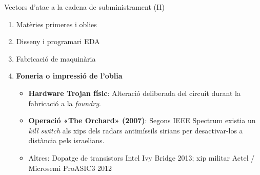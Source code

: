 \documentclass[catalan]{beamer}
\begin{document}

\begin{frame}{Vectors d'atac a la cadena de subministrament (II)}
  \begin{enumerate}
    \item \textcolor{black!35}{Matèries primeres i oblies}
    \item \textcolor{black!35}{Disseny i programari EDA}
    \item \textcolor{black!35}{Fabricació de maquinària}
    \item \textbf{\textcolor{structure}{Foneria o impressió de l'oblia}}
      \begin{itemize}
          \item \textbf{Hardware Trojan físic}: Alteració deliberada del circuit durant la fabricació a la \textit{foundry}. \\
          \pause
        \item \textbf{Operació «The Orchard» (2007)}: Segons IEEE Spectrum existia un \textit{kill switch} als xips dels radars antimíssils sirians per desactivar-los a distància pels israelians.
          \item \textcolor{black!35}{Altres: Dopatge de transistors Intel Ivy Bridge 2013; xip militar Actel / Microsemi ProASIC3 2012}
      \end{itemize}
  \end{enumerate}
\end{frame}
\end{document}
